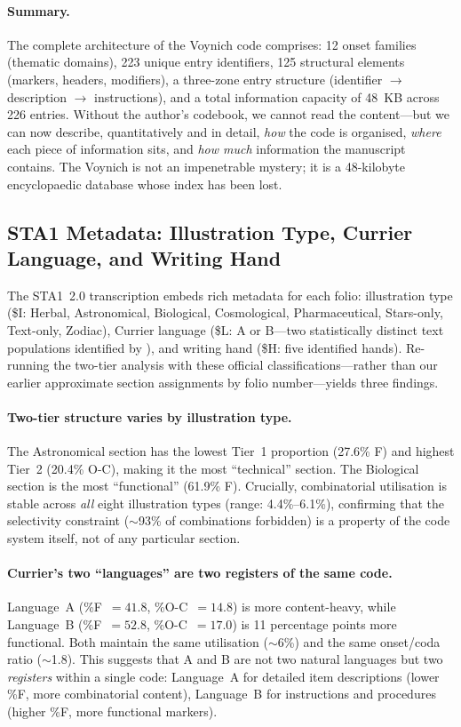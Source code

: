 \paragraph{Summary.}
The complete architecture of the Voynich code comprises: 12 onset families (thematic domains), 223 unique entry identifiers, 125 structural elements (markers, headers, modifiers), a three-zone entry structure (identifier $\to$ description $\to$ instructions), and a total information capacity of 48~KB across 226 entries.  Without the author's codebook, we cannot read the content---but we can now describe, quantitatively and in detail, \emph{how} the code is organised, \emph{where} each piece of information sits, and \emph{how much} information the manuscript contains.  The Voynich is not an impenetrable mystery; it is a 48-kilobyte encyclopaedic database whose index has been lost.

\subsection{STA1 Metadata: Illustration Type, Currier Language, and Writing Hand}

The STA1~2.0 transcription embeds rich metadata for each folio: illustration type (\$I: Herbal, Astronomical, Biological, Cosmological, Pharmaceutical, Stars-only, Text-only, Zodiac), Currier language (\$L: A or B---two statistically distinct text populations identified by \citealt{currier1976}), and writing hand (\$H: five identified hands).  Re-running the two-tier analysis with these official classifications---rather than our earlier approximate section assignments by folio number---yields three findings.

\paragraph{Two-tier structure varies by illustration type.}
The Astronomical section has the lowest Tier~1 proportion (27.6\% F) and highest Tier~2 (20.4\% O-C), making it the most ``technical'' section.  The Biological section is the most ``functional'' (61.9\% F).  Crucially, combinatorial utilisation is stable across \emph{all} eight illustration types (range: 4.4\%--6.1\%), confirming that the selectivity constraint ($\sim$93\% of combinations forbidden) is a property of the code system itself, not of any particular section.

\paragraph{Currier's two ``languages'' are two registers of the same code.}
Language~A (\%F~$= 41.8$, \%O-C~$= 14.8$) is more content-heavy, while Language~B (\%F~$= 52.8$, \%O-C~$= 17.0$) is 11 percentage points more functional.  Both maintain the same utilisation ($\sim$6\%) and the same onset/coda ratio ($\sim$1.8).  This suggests that A and B are not two natural languages but two \emph{registers} within a single code: Language~A for detailed item descriptions (lower \%F, more combinatorial content), Language~B for instructions and procedures (higher \%F, more functional markers).

